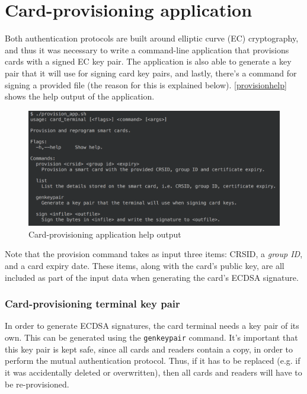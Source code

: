 \documentclass[12pt,a4paper,twoside,openright]{report}
\begin{document}
\section{Card-provisioning application}
\label{provisionapp}

Both authentication protocols are built around elliptic curve (EC) cryptography, and thus it was necessary to write a command-line application that provisions cards with a signed EC key pair. The application is also able to generate a key pair that it will use for signing card key pairs, and lastly, there's a command for signing a provided file (the reason for this is explained below). \autoref{provisionhelp} shows the help output of the application.

\begin{figure}[tbh]
\centerline{\includegraphics[scale=0.7]{figures/provisionhelp.png}}
\caption{Card-provisioning application help output}
\label{provisionhelp}
\end{figure}

Note that the provision command takes as input three items: CRSID, a \emph{group ID}, and a card expiry date. These items, along with the card's public key, are all included as part of the input data when generating the card's ECDSA signature.

\subsubsection{Card-provisioning terminal key pair}

In order to generate ECDSA signatures, the card terminal needs a key pair of its own. This can be generated using the \texttt{genkeypair} command. It's important that this key pair is kept safe, since all cards and readers contain a copy, in order to perform the mutual authentication protocol. Thus, if it has to be replaced (e.g. if it was accidentally deleted or overwritten), then all cards and readers will have to be re-provisioned.
\end{document}
